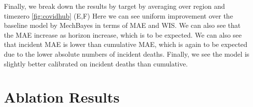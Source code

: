 \documentclass[11pt]{amsart}
\begin{document}
Finally, we break down the results by target by averaging over region and timezero  \ref{fig:covidhub} (E,F) Here we can see uniform improvement over the baseline model by MechBayes in terms of MAE and WIS. We can also see that the MAE increase as horizon increase, which is to be expected. We can also see that incident MAE is lower than cumulative MAE, which is again to be expected due to the lower absolute numbers of incident deaths. Finally, we see the model is slightly better calibrated on incident deaths than cumulative.
%
%   
   
   
   \section{Ablation Results}
\end{document}
